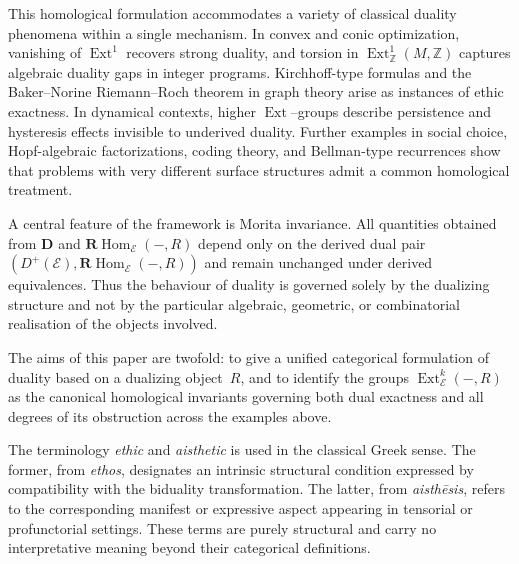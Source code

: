 \documentclass[12pt]{article}
\newcommand{\E}{\mathcal{E}}
\newcommand{\ZZ}{\mathbb{Z}}
\newcommand{\Ext}{\operatorname{Ext}}
\newcommand{\RHom}{\mathbf{R}\!\operatorname{Hom}}
\theoremstyle{plain}
\theoremstyle{definition}
\theoremstyle{remark}
\numberwithin{equation}{section}
\begin{document}
This homological formulation accommodates a variety of classical duality
phenomena within a single mechanism.  In convex and conic optimization,
vanishing of $\Ext^1$ recovers strong duality, and torsion in
$\Ext^1_\ZZ(M,\ZZ)$ captures algebraic duality gaps in integer programs.
Kirchhoff-type formulas and the Baker--Norine Riemann--Roch theorem in graph
theory arise as instances of ethic exactness.  In dynamical contexts, higher
$\Ext$--groups describe persistence and hysteresis effects invisible to
underived duality.  Further examples in social choice, Hopf-algebraic
factorizations, coding theory, and Bellman-type recurrences show that problems
with very different surface structures admit a common homological treatment.

A central feature of the framework is Morita invariance.  All quantities obtained
from $\mathbf D$ and $\RHom_\E(-,R)$ depend only on the derived dual pair
$(D^+(\E),\RHom_\E(-,R))$ and remain unchanged under derived equivalences.
Thus the behaviour of duality is governed solely by the dualizing structure and
not by the particular algebraic, geometric, or combinatorial realisation of the
objects involved.

The aims of this paper are twofold: to give a unified categorical formulation of
duality based on a dualizing object~$R$, and to identify the groups
$\Ext^k_\E(-,R)$ as the canonical homological invariants governing both dual
exactness and all degrees of its obstruction across the examples above.

The terminology \emph{ethic} and \emph{aisthetic} is used in the classical Greek
sense.  The former, from \emph{ethos}, designates an intrinsic structural
condition expressed by compatibility with the biduality transformation.  The
latter, from \emph{aisth\={e}sis}, refers to the corresponding manifest or
expressive aspect appearing in tensorial or profunctorial settings.  These terms
are purely structural and carry no interpretative meaning beyond their
categorical definitions.



\end{document}
